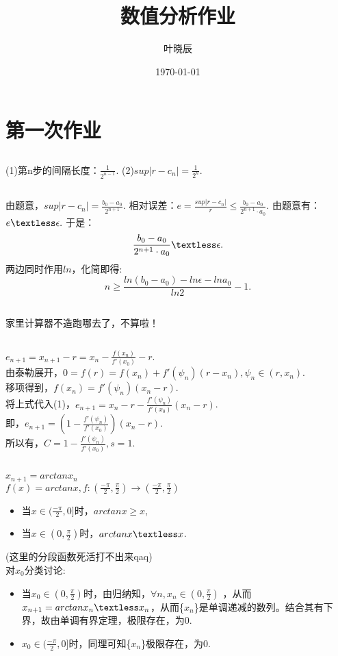 \documentclass[UTF8]{ctexart}
\title{数值分析作业}
\author{叶晓辰}
\date{\today}
\begin{document}
\maketitle
\section{第一次作业}
\subsection{}
(1)第n步的间隔长度：$\frac{1}{2^{n-1}}$.
(2)$sup\vert r-c_{n}\vert=\frac{1}{2^{n}}$.
\subsection{}
由题意，$sup\vert r-c_{n}\vert= \frac{b_{0}-a_{0}}{2^{n+1}}$.
相对误差：$e=\frac{sup \vert r-c_{n} \vert}{r}\le \frac{b_{0}-a_{0}}{2^{n+1}\cdot a_{0}}$.
由题意有：
  $e \textless \epsilon .$
于是：
\[ \frac{b_{0}-a_{0}}{2^{n+1}\cdot a_{0} }\textless \epsilon .\]
两边同时作用$ln$，化简即得:
\[ n \ge \frac{ln(b_{0}-a_{0})-ln\epsilon-lna_{0}}{ln2}-1. \]
\subsection{} 
家里计算器不造跑哪去了，不算啦！
\subsection{}
$e_{n+1}=x_{n+1}-r=x_n-\frac{f(x_n)}{f'(x_0)}-r.$ \\
由泰勒展开，$0=f(r)=f(x_n)+f'(\psi_n)(r-x_n), \psi_n\in (r,x_n)$.\\
移项得到，$f(x_n)=f'(\psi_n)(x_n-r)$.\\
将上式代入(1)，$e_{n+1}=x_n-r-\frac{f'(\psi_n)}{f'(x_0)}(x_n-r)$. \\ 
即，$e_{n+1}=(1-\frac{f'(\psi_n)}{f'(x_0)})(x_n-r).$\\
所以有，$C=1-\frac{f'(\psi_n)}{f'(x_0)}, s=1.$
\subsection{}
$x_{n+1}=arctanx_n$\\
$f(x)=arctanx,  f:(\frac{-\pi}{2},\frac{\pi}{2})\rightarrow (\frac{-\pi}{2},\frac{\pi}{2})$
\begin{itemize}
\item 当$x \in (\frac{-\pi}{2},0]$时，$arctanx \ge x$,
\item 当$x \in (0,\frac{\pi}{2})$时，$arctanx \textless x$.
\end{itemize}
(这里的分段函数死活打不出来qaq)\\
对$x_0$分类讨论:
\begin{itemize}
\item 当$x_0\in(0,\frac{\pi}{2})$时，由归纳知，$\forall n, x_n \in (0,\frac{\pi}{2})$ ，从而$x_{n+1}=arctanx_n\textless x_n$，从而\{$x_n$\}是单调递减的数列。结合其有下界，故由单调有界定理，极限存在，为0.
\item $x_{0} \in (\frac{-\pi}{2},0]$时，同理可知\{$x_n$\}极限存在，为0.
\end{itemize}
\end{document}
